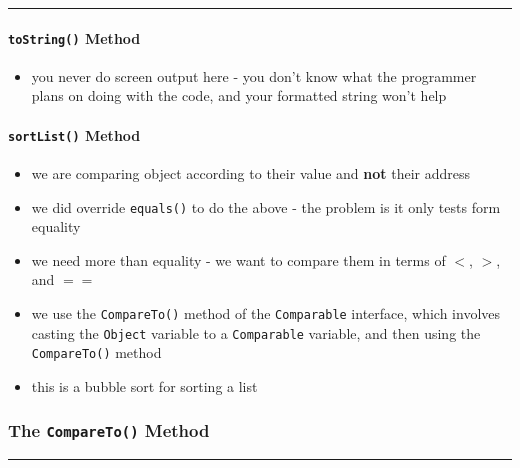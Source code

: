 \vspace{0.1cm}
\noindent
\textcolor{RedOrange}{\rule{\textwidth}{0.5pt}}

\paragraph*{\texttt{toString()} Method}


\begin{itemize}
    \item[] you never do screen output here - you don't know what the programmer plans on doing with the code, and your formatted string won't help
\end{itemize}

\paragraph*{\texttt{sortList()} Method}


\begin{itemize}
    \item[] we are comparing object according to their \textcolor{RedOrange}{value} and \textbf{\textcolor{RedOrange}{not}} their \textcolor{RedOrange}{address}
    \item[] we did override \texttt{equals()} to do the above - the problem is it only tests form equality
    \item[] we need more than equality - we want to compare them in terms of $<$, $>$, and $==$
    \item[] we use the \texttt{CompareTo()} method of the \texttt{Comparable} interface, which involves casting the \texttt{Object} variable to a \texttt{Comparable} variable, and then using the \texttt{CompareTo()} method
    \item[] this is a bubble sort for sorting a list
\end{itemize}

\subsubsection{The \texttt{CompareTo()} Method}


\vspace{0.1cm}
\noindent
\textcolor{RedOrange}{\rule{\textwidth}{0.5pt}}
\vspace{-0.1cm}

